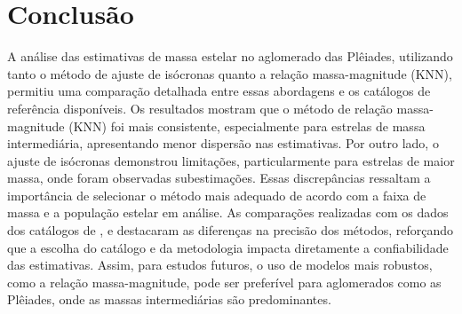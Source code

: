 \section{\textbf{Conclusão}}

A análise das estimativas de massa estelar no aglomerado das Plêiades, utilizando tanto o método de ajuste de isócronas quanto a relação massa-magnitude (KNN), permitiu uma comparação detalhada entre essas abordagens e os catálogos de referência disponíveis. Os resultados mostram que o método de relação massa-magnitude (KNN) foi mais consistente, especialmente para estrelas de massa intermediária, apresentando menor dispersão nas estimativas. Por outro lado, o ajuste de isócronas demonstrou limitações, particularmente para estrelas de maior massa, onde foram observadas subestimações. Essas discrepâncias ressaltam a importância de selecionar o método mais adequado de acordo com a faixa de massa e a população estelar em análise. As comparações realizadas com os dados dos catálogos de ,  e  destacaram as diferenças na precisão dos métodos, reforçando que a escolha do catálogo e da metodologia impacta diretamente a confiabilidade das estimativas. Assim, para estudos futuros, o uso de modelos mais robustos, como a relação massa-magnitude, pode ser preferível para aglomerados como as Plêiades, onde as massas intermediárias são predominantes.